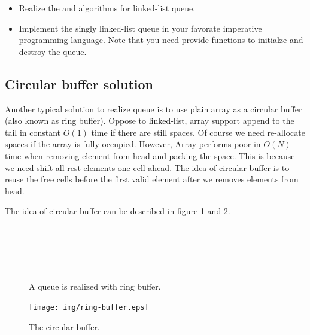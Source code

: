 \documentclass{article}
\begin{document}
\begin{Exercise}
\begin{itemize}
\item Realize the  and  algorithms
for linked-list queue.

\item Implement the singly linked-list queue in your favorate imperative 
programming language. Note that you need provide functions to initialze
and destroy the queue.
\end{itemize}
\end{Exercise}

\subsection{Circular buffer solution}

Another typical solution to realize queue is to use plain array as
a circular buffer (also known as ring buffer). 
Oppose to linked-list, array support append to the 
tail in constant $O(1)$ time if there are still spaces. Of course
we need re-allocate spaces if the array is fully occupied. However,
Array performs poor in $O(N)$ time when removing element from head
and packing the space. This is because we need shift all rest elements
one cell ahead. The idea of circular buffer is to reuse the free
cells before the first valid element after we removes elements from
head.

The idea of circular buffer can be described in figure \ref{fig:circular-buffer-queue}
and \ref{fig:circular-buffer}.

\begin{figure}[htbp]
 \centering
  \\
  \\
  \\
  \\
 \caption{A queue is realized with ring buffer.} \label{fig:circular-buffer-queue}
\end{figure}

\begin{figure}[htbp]
 \centering
 \texttt{[image: img/ring-buffer.eps]}
 \caption{The circular buffer.} \label{fig:circular-buffer}
\end{figure}
\end{document}
